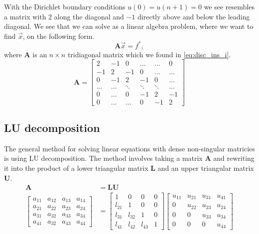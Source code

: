 \documentclass[10pt, a4paper]{amsart}
\begin{document}
With the Dirichlet boundary conditions $u(0) = u(n+1) = 0$ we see resembles a matrix with $2$ along the diagonal and $-1$ directly above and below the leading diagonal. We see that we can solve as a linear algebra problem, where we want to find $\vec{x}$, on the following form. 
\begin{equation}
\mathbf{A}\vec{x} = f^*, \nonumber
\end{equation}
where $\mathbf{A}$ is an $n\times n$ tridiagonal matrix which we found in \ref{eq:disc_ins_i}.
\begin{equation}\label{mat:tridiag_1_n}
\mathbf{A} = 
\begin{bmatrix}
2 & -1 & 0 & \dots & \dots & 0 \\
-1 & 2 & -1 & 0 & \dots & \dots \\
0 & -1 & 2 & -1 & 0 & \dots \\
\dots & \dots & \ddots & \ddots & \ddots & \dots\\
0 & \dots & 0 & -1 & 2 & -1 \\
0 & \dots & \dots & 0 & -1 & 2
\end{bmatrix}
\end{equation}

\subsection{LU decomposition}
The general method for solving linear equations with dense non-singular matricies is using LU decomposition. The method involves taking a matrix $\mathbf{A}$ and rewriting it into the product of a lower triangular matrix $\mathbf{L}$ and an upper triangular matrix $\mathbf{U}$. 
\begin{align*}
\mathbf{A} &= \mathbf{L}\mathbf{U}\\
\begin{bmatrix}
	a_{11} & a_{12} & a_{13} & a_{14} \\
	a_{21} &a_{22} &a_{23} &a_{24} \\
	a_{31} &a_{32} &a_{33} &a_{34}  \\
	a_{41} &a_{32} &a_{43} &a_{44} 
\end{bmatrix}
&= 
\begin{bmatrix}
1& 0 & 0 & 0 \\
 l_{21}& 1& 0 & 0\\
 l_{31}&l_{32}&1& 0\\
 l_{41}&l_{42}&l_{43}&1
\end{bmatrix}
\begin{bmatrix}
u_{11}& u_{21}&u_{31}&u_{41}\\
0 & u_{22} & u_{23}& u_{24} \\
0 & 0 & u_{33}& u_{34}\\
0 & 0 & 0 & u_{44}
\end{bmatrix}
\end{align*}
\end{document}
